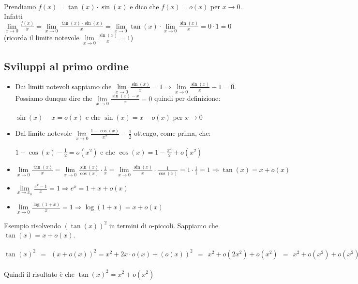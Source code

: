 \begin{example}
Prendiamo $f(x) = \tan(x) \cdot \sin(x)$ e dico che $f(x) = o(x)$ per $x\to 0$.
Infatti $\lim\limits_{x\to 0}\frac{f(x)}{x} = \lim\limits_{x\to 0}\frac{\tan(x) \cdot \sin(x)}{x} = \lim\limits_{x\to 0}\tan(x) \cdot \lim\limits_{x\to 0}\frac{\sin(x)}{x} = 0 \cdot 1 = 0$ (ricorda il limite notevole $\lim\limits_{x\to0}\frac{\sin(x)}{x} = 1$)
\end{example}

\newpage
\subsection{Sviluppi al primo ordine}
\begin{itemize}
    \item Dai limiti notevoli sappiamo che $\lim\limits_{x\to 0}\frac{\sin(x)}{x} = 1 \Longrightarrow \lim\limits_{x\to 0}\frac{\sin(x)}{x} - 1 = 0$.\\
    Possiamo dunque dire che $\lim\limits_{x\to 0}\frac{\sin(x) - x}{x} = 0$ quindi per definizione:
    \begin{center}
        \vspace{-5pt}
        $\sin(x) - x = o(x)$ \:\:\: e che \:\:\: $\sin(x) = x - o(x)$ per $x\to 0$
    \end{center} 
    \item Dal limite notevole $\lim\limits_{x\to 0}\frac{1 - \cos(x)}{x^2} = \frac{1}{2}$ ottengo, come prima, che:
    \begin{center}
        \vspace{-5pt}
        $1 - \cos(x) - \frac{1}{2} = o(x^2)$ \:\:\: e che \:\:\: $\cos(x) = 1 - \frac{x^2}{2} + o(x^2)$
    \end{center}
    \item $\lim\limits_{x\to 0}\frac{\tan(x)}{x} = \lim\limits_{x\to 0}\frac{\sin(x)}{\cos(x)} \cdot \frac{1}{x} = \lim\limits_{x\to 0}\frac{\sin(x)}{x} \cdot \frac{1}{\cos(x)} = 1 \cdot \frac{1}{1} = 1 \Longrightarrow \tan(x) = x + o(x)$
    \item $\lim\limits_{x\to x_0}\frac{e^x - 1}{x} = 1 \Longrightarrow e^x = 1 + x + o(x)$
    \item $\lim\limits_{x\to 0} \frac{\log(1 + x)}{x} = 1 \Longrightarrow \log(1 + x) = x + o(x)$
\end{itemize}

\begin{example}
    Esempio risolvendo $(\tan(x))^2$ in termini di o-piccoli. Sappiamo che $\tan(x) = x + o(x)$.\\\\
    $\tan(x)^2 \:\: = \:\: (x + o(x))^2 = x^2 + 2x \cdot o(x) + (o(x))^2 \:\: = \:\: x^2 + o(2x^2) + o(x^2) \:\: = \:\: x^2 + o(x^2) + o(x^2) \:\: = \:\: x^2 + o(x^2)$\\\\
    Quindi il risultato è che $\tan(x)^2 = x^2 + o(x^2) $
\end{example}

